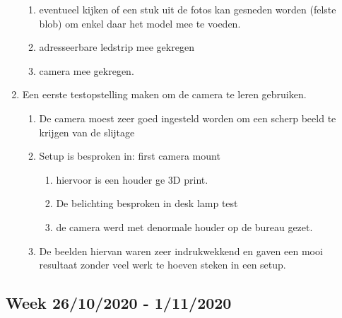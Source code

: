 \documentclass{article}
\begin{document}
\begin{enumerate}[1]
\begin{enumerate}[a]
	\item eventueel kijken of een stuk uit de fotos kan gesneden worden (felste blob) om enkel daar het model mee te voeden.
	\item adresseerbare ledstrip mee gekregen
	\item camera mee gekregen.
	\end{enumerate}
\item Een eerste testopstelling maken om de camera te leren gebruiken.
	\begin{enumerate}[a]
	\item De camera moest zeer goed ingesteld worden om een scherp beeld te krijgen van de slijtage
	\item Setup is besproken in: first camera mount
		\begin{enumerate}[1]
		\item hiervoor is een houder ge 3D print.
		\item De belichting besproken in desk lamp test
		\item de camera werd met denormale houder op de bureau gezet. 
		\end{enumerate}
	\item De beelden hiervan waren zeer indrukwekkend en gaven een mooi resultaat zonder veel werk te hoeven steken in een setup.
	\end{enumerate}
\end{enumerate}


\subsection{Week 26/10/2020 - 1/11/2020}
\end{document}
